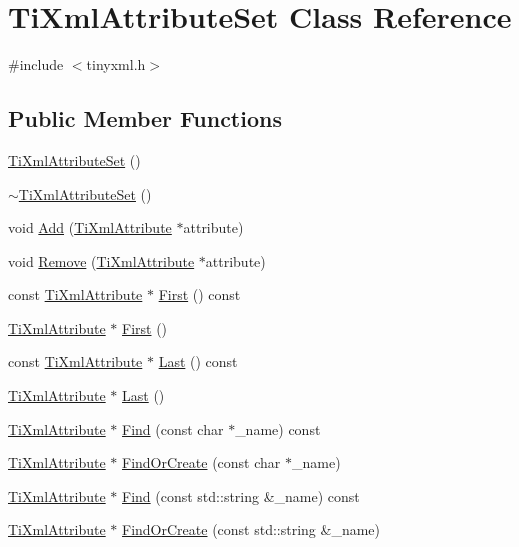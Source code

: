 \hypertarget{class_ti_xml_attribute_set}{\section{Ti\-Xml\-Attribute\-Set Class Reference}
\label{class_ti_xml_attribute_set}
}


{\ttfamily \#include $<$tinyxml.\-h$>$}

\subsection*{Public Member Functions}
\begin{DoxyCompactItemize}
\item 
\hyperlink{class_ti_xml_attribute_set_a253c33b657cc85a07f7f060b02146c35}{Ti\-Xml\-Attribute\-Set} ()
\item 
\hyperlink{class_ti_xml_attribute_set_add463905dff96142a29fe16a01ecf28f}{$\sim$\-Ti\-Xml\-Attribute\-Set} ()
\item 
void \hyperlink{class_ti_xml_attribute_set_a745e50ddaae3bee93e4589321e0b9c1a}{Add} (\hyperlink{class_ti_xml_attribute}{Ti\-Xml\-Attribute} $\ast$attribute)
\item 
void \hyperlink{class_ti_xml_attribute_set_a924a73d071f2573f9060f0be57879c57}{Remove} (\hyperlink{class_ti_xml_attribute}{Ti\-Xml\-Attribute} $\ast$attribute)
\item 
const \hyperlink{class_ti_xml_attribute}{Ti\-Xml\-Attribute} $\ast$ \hyperlink{class_ti_xml_attribute_set_ae0636e88cedd4b09d61c451860f68598}{First} () const 
\item 
\hyperlink{class_ti_xml_attribute}{Ti\-Xml\-Attribute} $\ast$ \hyperlink{class_ti_xml_attribute_set_a99703bb08ca2aece2d7ef835de339ba0}{First} ()
\item 
const \hyperlink{class_ti_xml_attribute}{Ti\-Xml\-Attribute} $\ast$ \hyperlink{class_ti_xml_attribute_set_a7b3f3ccf39a97bc25539d3fcc540296a}{Last} () const 
\item 
\hyperlink{class_ti_xml_attribute}{Ti\-Xml\-Attribute} $\ast$ \hyperlink{class_ti_xml_attribute_set_ab4c4edfb2d74f6ea31aae096743bd6e0}{Last} ()
\item 
\hyperlink{class_ti_xml_attribute}{Ti\-Xml\-Attribute} $\ast$ \hyperlink{class_ti_xml_attribute_set_af3675cc2bfd0aea153cda1cfcdd1f77e}{Find} (const char $\ast$\-\_\-name) const 
\item 
\hyperlink{class_ti_xml_attribute}{Ti\-Xml\-Attribute} $\ast$ \hyperlink{class_ti_xml_attribute_set_a5e28f5d32f048fba85d04dc317495bdc}{Find\-Or\-Create} (const char $\ast$\-\_\-name)
\item 
\hyperlink{class_ti_xml_attribute}{Ti\-Xml\-Attribute} $\ast$ \hyperlink{class_ti_xml_attribute_set_ab6d6c98b99a257e38fec81cae36a54d1}{Find} (const std\-::string \&\-\_\-name) const 
\item 
\hyperlink{class_ti_xml_attribute}{Ti\-Xml\-Attribute} $\ast$ \hyperlink{class_ti_xml_attribute_set_acccd76e3d87a92caed2795266c6e540e}{Find\-Or\-Create} (const std\-::string \&\-\_\-name)
\end{DoxyCompactItemize}


